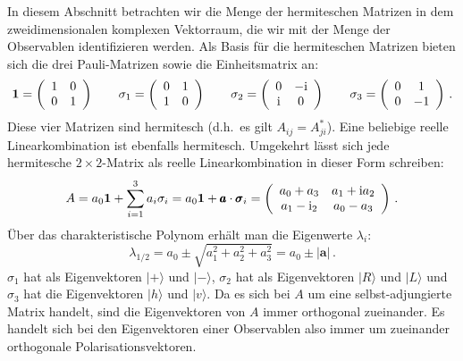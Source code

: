 In diesem Abschnitt betrachten wir die Menge der hermiteschen Matrizen in dem zweidimensionalen
komplexen Vektorraum, die wir mit der Menge der Observablen identifizieren werden. Als Basis f\"ur die hermiteschen
Matrizen bieten sich die drei Pauli-Matrizen sowie die Einheitsmatrix an:
\begin{equation}
   {\bf 1} = \left( \begin{array}{cc}  1 & 0 \\ 0 & 1 \end{array} \right)  \hspace{0.7cm}
   \sigma_1  = \left( \begin{array}{cc}  0 & 1 \\ 1 & 0 \end{array} \right)  \hspace{0.7cm}
   \sigma_2  = \left( \begin{array}{cc}  0 & -{\rm i} \\ {\rm i} & 0 \end{array} \right)  \hspace{0.7cm}
   \sigma_3 = \left( \begin{array}{cc}  0 & 1 \\ 0 & -1 \end{array} \right)  \, .
\end{equation}
Diese vier Matrizen sind hermitesch (d.h.\ es gilt $A_{ij}=A^*_{ji}$). Eine beliebige reelle Linearkombination
ist ebenfalls hermitesch. Umgekehrt l\"asst sich jede hermitesche $2\times 2$-Matrix als reelle Linearkombination
in dieser Form schreiben:
\begin{equation}
      A = a_0 {\bf 1} + \sum_{i=1}^3 a_i \sigma_i = a_0 {\bf 1} + \pmb{a} \cdot \pmb{\sigma}_i
         =     \left( \begin{array}{cc}  a_0 + a_3 & a_1+{\rm i}a_2 \\ a_1 - {\rm i}_2 &  a_0 - a_3 \end{array} \right) \, .
\end{equation} 
\"Uber das charakteristische Polynom erh\"alt man die Eigenwerte $\lambda_i$:
\begin{equation}
\label{eq_QM1_Eigenwerte}
           \lambda_{1/2} = a_0 \pm \sqrt{a_1^2 + a_2^2 + a_3^2} = a_0 \pm | \pmb{a} |  \, .
\end{equation} 
$\sigma_1$ hat als Eigenvektoren $|+\rangle$ und $|-\rangle$, $\sigma_2$ hat als Eigenvektoren
$|R\rangle$ und $|L\rangle$ und $\sigma_3$ hat die Eigenvektoren $|h\rangle$ und $|v\rangle$. Da es
sich bei $A$ um eine selbst-adjungierte Matrix handelt, sind die Eigenvektoren von $A$ immer orthogonal
zueinander. Es handelt sich bei den Eigenvektoren einer Observablen also immer um zueinander orthogonale 
Polarisationsvektoren.

